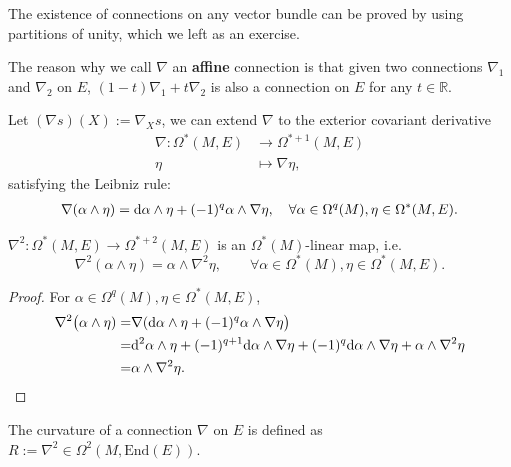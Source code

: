 The existence of connections on any vector bundle can be proved by using partitions of unity, which we left as an exercise.

The reason why we call $\nabla$ an \textbf{affine} connection is that given two connections $\nabla_1$ and $\nabla_2$ on $E$, 
$(1-t)\nabla_1 + t\nabla_2$ is also a connection on $E$ for any $t\in \mathbb{R}$.

Let $(\nabla s)(X):= \nabla_X s$, we can extend $\nabla$ to the exterior covariant derivative
\begin{align*}
    \nabla: \Omega^*(M,E) &\to \Omega^{*+1}(M,E) \\
    \eta &\mapsto \nabla \eta,
\end{align*}
satisfying the Leibniz rule:
\begin{align*}
    \nabla(\alpha\wedge\eta) = {\rm d}\alpha\wedge\eta + (-1)^{q}\alpha\wedge \nabla\eta,
    \quad\forall \alpha\in \Omega^q(M),\eta\in \Omega^*(M,E).
\end{align*}
\begin{proposition}
    $\nabla^2: \Omega^*(M,E)\to\Omega^{*+2}(M,E)$ is an $\Omega^*(M)$-linear map, i.e.
    \begin{equation*}
        \nabla^2(\alpha\wedge\eta) = \alpha\wedge\nabla^2 \eta,
        \qquad\forall \alpha\in \Omega^*(M),\eta\in \Omega^*(M,E).
    \end{equation*}
\end{proposition}
\begin{proof}
    For $\alpha\in \Omega^q(M),\eta\in \Omega^*(M,E)$, 
    \begin{align*}
        \nabla^2\big(\alpha\wedge\eta) =& \nabla({\rm d}\alpha\wedge\eta + (-1)^{q}\alpha\wedge \nabla\eta\big) \\
        =& {\rm d}^2\alpha\wedge\eta + (-1)^{q+1}{\rm d}\alpha\wedge \nabla\eta + (-1)^q {\rm d}\alpha\wedge \nabla\eta + \alpha\wedge\nabla^2 \eta \\
        =& \alpha\wedge\nabla^2 \eta.
    \end{align*}
\end{proof}
\begin{definition}
    The curvature of a connection $\nabla$ on $E$ is defined 
    as $R:=\nabla^2\in\Omega^2(M,\mathrm{End}(E))$.
\end{definition}
